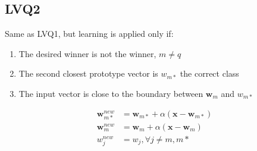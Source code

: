 \subsection{LVQ2}
Same as LVQ1, but learning is applied only if:
\begin{enumerate}
\item The desired winner is not the winner, $m \ne q$
\item The second closest prototype vector is $w_{m*}$ the correct class
\item The input vector is close to the boundary between $\mathbf{w}_m$ and $w_{m*}$
\end{enumerate}
\begin{equation*}
\begin{split}
\mathbf{w}_{m*}^{new} &= \mathbf{w}_{m*} + \alpha (\mathbf{x} - \mathbf{w}_{m*}) \\
\mathbf{w}_{m}^{new} &= \mathbf{w}_{m} + \alpha (\mathbf{x} - \mathbf{w}_{m}) \\
w_j^{new} &= w_j, \forall j \ne m, m*\end{split}
\end{equation*}
